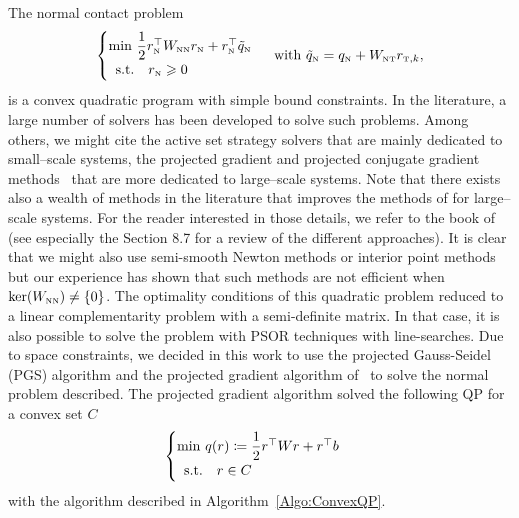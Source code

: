 The normal contact problem
 \begin{equation}
  \label{eq:AO-3-bis}
  \begin{cases}
    \min\, \Frac 1 2 r_\n^\top  W_{\n\n} r_\n + r_\n^\top \tilde q_\n \\
    \begin{array}{ll}
    \text{s.t.} & r_\n \geq 0
  \end{array}\end{cases} \text{ with }   \tilde q_\n =  q_\n + W_{\n\t}r_{\t,k},
\end{equation}
is a convex quadratic program with simple bound constraints.
%
In the literature, a large number of solvers has been developed to solve such problems. Among others, we might cite the active set strategy solvers \cite{Fletcher1987,Nocedal.Wright1999} that are mainly dedicated to  small--scale systems, the projected gradient \cite{Calamai.More1987} and projected conjugate gradient methods~\citep{More.Toraldo_NM1989,More.Toraldo1991} that are more dedicated to large--scale systems. Note that there exists also a wealth of methods in the literature that improves the methods of \cite{More.Toraldo1991} for large--scale systems. For the reader interested in those details, we refer to the book of \cite{Dostal.ea_AMM2016}(see especially the Section 8.7 for a review of the different approaches).
%
It is clear that we might also use semi-smooth Newton methods or interior point methods but our experience has shown that such methods are not efficient when $\ker (W_{{\hbox{\tiny{N}}}{\hbox{\tiny{N}}}}) \neq \{0\}$. The optimality conditions of this quadratic problem  reduced to a linear complementarity problem with a semi-definite matrix. In that case, it is also possible to solve the problem with PSOR techniques with line-searches.
%
Due to space constraints, we decided in this work to use the projected Gauss-Seidel (PGS) algorithm and the projected gradient algorithm of~\cite{Calamai.More1987} to solve the normal problem described. The projected gradient algorithm solved
the following QP for a convex set $C$
 \begin{equation}
  \label{eq:ConvexQP}
  \begin{cases}
    \min\, q(r) \coloneqq \Frac 1 2 r^\top  W r + r ^\top  b \\
    \begin{array}{ll}
    \text{s.t.} & r \in C
  \end{array}\end{cases}
\end{equation}
with the algorithm described in  Algorithm~\ref{Algo:ConvexQP}.

